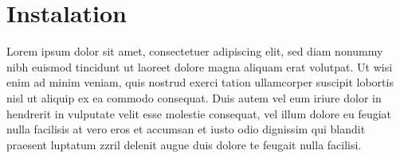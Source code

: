 {
	\section{Instalation}
}
Lorem ipsum dolor sit amet, consectetuer adipiscing elit, sed diam nonummy nibh euismod tincidunt ut laoreet dolore magna aliquam erat volutpat. Ut wisi enim ad minim veniam, quis nostrud exerci tation ullamcorper suscipit lobortis nisl ut aliquip ex ea commodo consequat. Duis autem vel eum iriure dolor in hendrerit in vulputate velit esse molestie consequat, vel illum dolore eu feugiat nulla facilisis at vero eros et accumsan et iusto odio dignissim qui blandit praesent luptatum zzril delenit augue duis dolore te feugait nulla facilisi.
